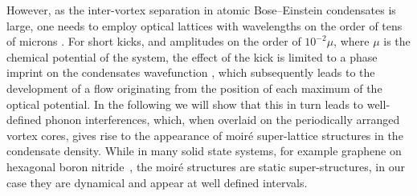  However, as the inter-vortex separation in atomic Bose--Einstein condensates is large, one needs to employ optical lattices with wavelengths on the order of tens of microns \cite{BEC:Fallani_optexp_2005,BEC:Williams_optexp_2008}.
For short kicks, and amplitudes on the order of $10^{-2} \mu $, where $\mu$ is the chemical potential of the system, the effect of the kick is limited to a phase imprint on the condensates wavefunction \cite{Vtx:Dobrek_pra_1999}, which subsequently leads to the development of a flow originating from the position of each maximum of the optical potential. In the following we will show that this in turn leads to well-defined phonon interferences, which, when overlaid on the periodically arranged vortex cores,  gives rise to the appearance of moir\'e super-lattice structures \cite{mor:murata_acsn_2010} in the condensate density. While in many solid state systems, for example graphene on hexagonal boron nitride~\cite{nphys2272}, the moir\'e structures are static super-structures, in our case they are dynamical and appear at well defined intervals.


